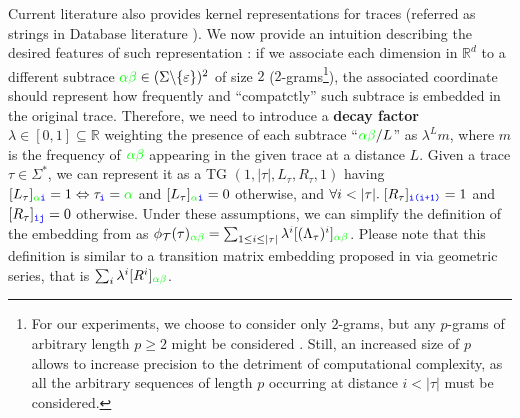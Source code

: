 Current literature also provides kernel representations for traces (referred as strings in Database literature \cite{LodhiSSCW02,Raedt,GartnerFW03}). We now provide an intuition describing the desired features of such representation \cite{LodhiSSCW02}: if we associate each dimension in $\mathbb{R}^d$ to a different subtrace ${\color{green}\alpha\beta}\in(\Sigma\backslash\{\varepsilon\})^2$ of size $2$ ($2$-grams\footnote{\label{fn:caveat}For our experiments, we choose to consider only $2$-grams, but any $p$-grams of arbitrary length $p\geq 2$ might be considered \cite{Gartner03}. Still, an increased size of $p$ allows to increase precision to the detriment of computational complexity, as all the arbitrary sequences of length $p$ occurring at distance $i<|\tau|$ must be considered.}), the associated coordinate should represent how frequently and ``compatctly'' such subtrace is embedded in the original trace. Therefore, we need to introduce a \textbf{decay factor} $\lambda\in[0,1]\subseteq\mathbb{R}$ weighting the presence of each subtrace ``${\color{green}\alpha\beta}/L$'' as $\lambda^Lm$, where $m$ is the frequency of $\color{green}\alpha\beta$ appearing in the given trace at a distance $L$. Given a trace $\tau\in\Sigma^*$, we can represent it as a TG \cite{Myers1989} $(1,{|\tau|},L_\tau,R_\tau,1)$ having $[L_\tau]_{{\color{green}\alpha}\texttt{\color{blue}i}}=1\Leftrightarrow \tau_{\texttt{\color{blue}i}}={\color{green}\alpha}$ and $[L_\tau]_{{\color{green}\alpha}\texttt{\color{blue}i}}=0$ otherwise, and $\forall i<|\tau|.\; [R_\tau]_{\texttt{\color{blue}i(i+1)}}=1 $ and $[R_\tau]_{\texttt{\color{blue}ij}}=0$ otherwise. Under these assumptions, we can simplify the definition of the embedding from \cite{LodhiSSCW02,Raedt} as $\phi_{\mathcal{T}}(\tau)_{{\color{green}\alpha\beta}}=\sum_{1\leq i\leq |\tau|}\lambda^i[(\Lambda_\tau)^i]_{\color{green}\alpha\beta}$. Please note that this definition is similar to a transition matrix embedding proposed in \cite{GartnerFW03} via geometric series, that is $\sum_i\lambda^i[R^i]_{\color{green}\alpha\beta}$. 

